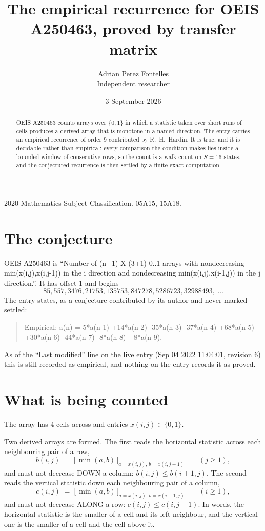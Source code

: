 \documentclass[11pt,a4paper]{article}
\title{The empirical recurrence for OEIS A250463, proved by transfer matrix}
\author{Adrian Perez Fontelles\\ \small Independent researcher}
\date{3 September 2026}
\theoremstyle{plain}
\theoremstyle{definition}
\begin{document}
\maketitle

\begin{abstract}
OEIS A250463 counts arrays over $\{0,1\}$ in which a statistic taken over short runs
of cells produces a derived array that is monotone in a named direction. The entry carries an
empirical recurrence of order $9$ contributed by R.~H.~Hardin. It is true, and it is
decidable rather than empirical: every comparison the condition makes lies inside a bounded
window of consecutive rows, so the count is a walk count on $S=16$ states, and the
conjectured recurrence is then settled by a finite exact computation.
\end{abstract}

\noindent\small 2020 Mathematics Subject Classification. 05A15, 15A18.\normalsize

\section{The conjecture}

OEIS A250463 is ``Number of (n+1) X (3+1) 0..1 arrays with nondecreasing min(x(i,j),x(i,j-1)) in the i direction and nondecreasing min(x(i,j),x(i-1,j)) in the j direction.''. It has offset $1$ and begins
\[
85, 557, 3476, 21753, 135753, 847278, 5286723, 32988493,\ \dots
\]
The entry states, as a conjecture contributed by its author and never marked settled:
\begin{quote}
Empirical: a(n) = 5*a(n-1) +14*a(n-2) -35*a(n-3) -37*a(n-4) +68*a(n-5) +30*a(n-6) -44*a(n-7) -8*a(n-8) +8*a(n-9).
\end{quote}
As of the ``Last modified'' line on the live entry (Sep 04 2022 11:04:01, revision 6) this is still
recorded as empirical, and nothing on the entry records it as proved.

\section{What is being counted}

The array has $4$ cells across and entries $x(i,j)\in\{0,1\}$.

Two derived arrays are formed. The first reads the horizontal statistic across each
neighbouring pair of a row,
\[
b(i,j)\;=\;\bigl[\,\min(a,b)\,\bigr]_{a=x(i,j),\,b=x(i,j-1)}\qquad (j\ge1),
\]
and must not decrease DOWN a column: $b(i,j)\le b(i{+}1,j)$. The second reads the vertical
statistic down each neighbouring pair of a column,
\[
c(i,j)\;=\;\bigl[\,\min(a,b)\,\bigr]_{a=x(i,j),\,b=x(i{-}1,j)}\qquad (i\ge1),
\]
and must not decrease ALONG a row: $c(i,j)\le c(i,j{+}1)$. In words, the horizontal statistic
is the smaller of a cell and its left neighbour, and the vertical one is
the smaller of a cell and the cell above it.
\end{document}
